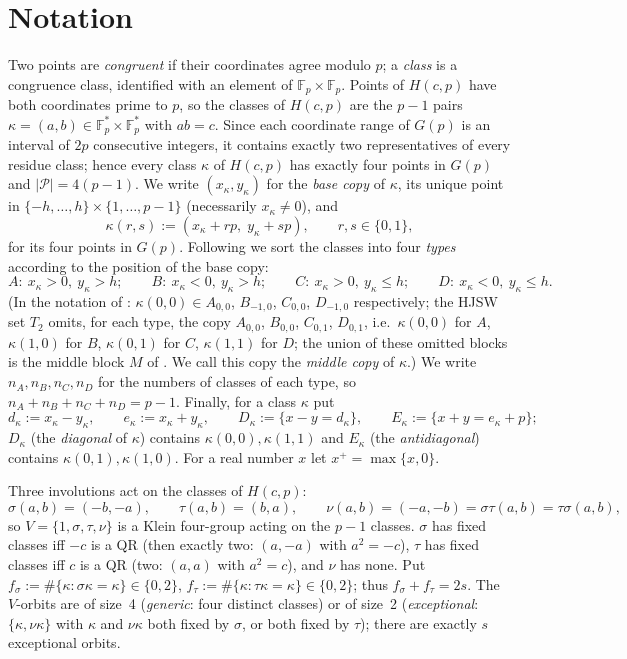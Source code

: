 \documentclass[11pt]{article}
\theoremstyle{remark}
\newcommand{\Fp}{\mathbb{F}_p}
\newcommand{\Hc}{H(c,p)}
\newcommand{\Gp}{G(p)}
\newcommand{\Pset}{\mathcal{P}}
\begin{document}
\section{Notation}

Two points are \emph{congruent} if their coordinates agree modulo $p$; a \emph{class} is a congruence class,
identified with an element of $\Fp\times\Fp$.  Points of $\Hc$ have both coordinates prime to $p$, so the classes of
$\Hc$ are the $p-1$ pairs $\kappa=(a,b)\in\Fp^*\times\Fp^*$ with $ab=c$.  Since each coordinate range of $\Gp$ is an
interval of $2p$ consecutive integers, it contains exactly two representatives of every residue class; hence
every class $\kappa$ of $\Hc$ has exactly four points in $\Gp$ and $|\Pset|=4(p-1)$.  We write
$(x_\kappa,y_\kappa)$ for the \emph{base copy} of $\kappa$, its unique point in
$\{-h,\dots,h\}\times\{1,\dots,p-1\}$ (necessarily $x_\kappa\ne0$), and
\[
 \kappa(r,s):=(x_\kappa+rp,\;y_\kappa+sp),\qquad r,s\in\{0,1\},
\]
for its four points in $\Gp$.  Following \cite{HJSW75,KNS25} we sort the classes into four \emph{types} according
to the position of the base copy:
\[
 A:\ x_\kappa>0,\ y_\kappa>h;\qquad B:\ x_\kappa<0,\ y_\kappa>h;\qquad C:\ x_\kappa>0,\ y_\kappa\le h;\qquad
 D:\ x_\kappa<0,\ y_\kappa\le h .
\]
(In the notation of \cite[Def.~2.3]{KNS25}: $\kappa(0,0)\in A_{0,0}$, $B_{-1,0}$, $C_{0,0}$, $D_{-1,0}$ respectively; the
HJSW set $T_2$ omits, for each type, the copy $A_{0,0}$, $B_{0,0}$, $C_{0,1}$, $D_{0,1}$, i.e.\ $\kappa(0,0)$ for
$A$, $\kappa(1,0)$ for $B$, $\kappa(0,1)$ for $C$, $\kappa(1,1)$ for $D$; the union of these omitted blocks is the middle
block $M$ of \cite[\S2.3]{KNS25}.  We call this copy the \emph{middle copy} of $\kappa$.)  We write $n_A,n_B,n_C,n_D$
for the numbers of classes of each type, so $n_A+n_B+n_C+n_D=p-1$.  Finally, for a class $\kappa$ put
\[
 d_\kappa:=x_\kappa-y_\kappa,\qquad e_\kappa:=x_\kappa+y_\kappa,\qquad
 D_\kappa:=\{x-y=d_\kappa\},\qquad E_\kappa:=\{x+y=e_\kappa+p\};
\]
$D_\kappa$ (the \emph{diagonal} of $\kappa$) contains $\kappa(0,0),\kappa(1,1)$ and $E_\kappa$ (the \emph{antidiagonal})
contains $\kappa(0,1),\kappa(1,0)$.  For a real number $x$ let $x^+=\max\{x,0\}$.

Three involutions act on the classes of $\Hc$:
\[
 \sigma(a,b)=(-b,-a),\qquad \tau(a,b)=(b,a),\qquad \nu(a,b)=(-a,-b)=\sigma\tau(a,b)=\tau\sigma(a,b),
\]
so $V=\{1,\sigma,\tau,\nu\}$ is a Klein four-group acting on the $p-1$ classes.  $\sigma$ has fixed classes iff $-c$ is a
QR (then exactly two: $(a,-a)$ with $a^2=-c$), $\tau$ has fixed classes iff $c$ is a QR (two: $(a,a)$ with $a^2=c$),
and $\nu$ has none.  Put $f_\sigma:=\#\{\kappa:\sigma\kappa=\kappa\}\in\{0,2\}$, $f_\tau:=\#\{\kappa:\tau\kappa=\kappa\}\in\{0,2\}$;
thus $f_\sigma+f_\tau=2s$.  The $V$-orbits are of size~4 (\emph{generic}: four distinct classes) or of size~2
(\emph{exceptional}: $\{\kappa,\nu\kappa\}$ with $\kappa$ and $\nu\kappa$ both fixed by $\sigma$, or both fixed by $\tau$);
there are exactly $s$ exceptional orbits.
\end{document}
